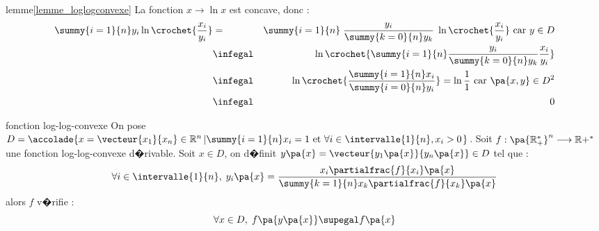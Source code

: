 \begin{xdemo}{lemme}{\ref{lemme_loglogconvexe}}
La fonction $x \longrightarrow \ln x$ est concave, donc :
        \begin{eqnarray*}
        \summy{i=1}{n} y_i \ln \crochet{\dfrac{x_i}{y_i}} &=&  \summy{i=1}{n} \;  \dfrac{y_i}{\summy{k=0}{n}y_k} \; 
                    \ln \crochet{\dfrac{x_i}{y_i}} \text{ car } y \in D\\
        &\infegal&  \ln \crochet { \summy{i=1}{n} \dfrac{y_i}{\summy{k=0}{n}y_k}  \dfrac{x_i}{y_i} } \\
        &\infegal&  \ln \crochet {  \dfrac{\summy{i=1}{n}x_i}{\summy{i=0}{n}y_i}  }  = 
        \ln \dfrac{1}{1} \text{ car } \pa{x,y} \in D^2 \\
        &\infegal& 0
        \end{eqnarray*}
\end{xdemo}











            \begin{xtheorem}{fonction log-log-convexe}
            \label{theorem_loglogconvexe}%
            On pose $D = \accolade{x=\vecteur{x_1}{x_n} \in \mathbb{R}^n \left| \summy{i=1}{n} x_i = 1 \text{ et } \forall i 
            \in \intervalle{1}{n}, x_i > 0 \right.} $.\newline%
            Soit $f : \pa{\mathbb{R}^*_+}^n \longrightarrow \mathbb{R}+^*$ une fonction log-log-convexe d�rivable.\newline%
            Soit $x \in D$, on d�finit $y \pa{x} = \vecteur{y_1\pa{x}}{y_n\pa{x}} \in D$ tel que :
                    $$
                    \forall i \in \intervalle{1}{n}, \; y_i \pa{x} = \frac{x_i \partialfrac{f}{x_i}\pa{x}}
                                {\summy{k=1}{n}x_k \partialfrac{f}{x_k}\pa{x}}
                    $$
            alors $f$ v�rifie :
                    $$
                    \forall x \in D, \; f\pa{ y \pa{x}} \supegal f\pa{x}
                    $$
            \end{xtheorem}
            
            
            
